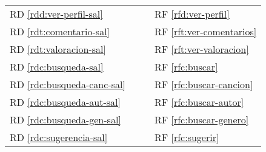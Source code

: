\begin{tabularx}{\linewidth}{l|XXX}

  RD \ref{rdd:ver-perfil-sal} & & & RF \ref{rfd:ver-perfil} \\
  RD \ref{rdt:comentario-sal} & & & RF \ref{rft:ver-comentarios} \\
  RD \ref{rdt:valoracion-sal} & & & RF \ref{rft:ver-valoracion} \\
  RD \ref{rdc:busqueda-sal} & & & RF \ref{rfc:buscar} \\
  RD \ref{rdc:busqueda-canc-sal} & & & RF \ref{rfc:buscar-cancion} \\
  RD \ref{rdc:busqueda-aut-sal} & & & RF \ref{rfc:buscar-autor} \\
  RD \ref{rdc:busqueda-gen-sal} & & & RF \ref{rfc:buscar-genero} \\
  RD \ref{rdc:sugerencia-sal} & & & RF \ref{rfc:sugerir} \\

\end{tabularx}


